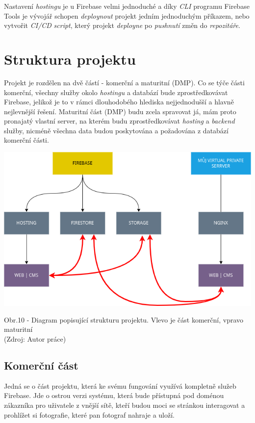\documentclass[12pt,a4paper]{report}
\begin{document}
  Nastavení \emph{hostingu} je u Firebase velmi jednoduché a díky \emph{CLI} programu Firebase Tools je vývojář schopen
  \emph{deploynout} projekt jedním jednoduchým příkazem, nebo vytvořit \emph{CI/CD} \emph{script}, který projekt \emph{deployne} po 
  \emph{pushnutí} změn do \emph{repozitáře}. 

  \chapter{Struktura projektu}
  Projekt je rozdělen na dvě částí - komerční a maturitní (DMP). Co se týče části komerční, všechny
  služby okolo \emph{hostingu} a databází bude zprostředkovávat Firebase, jelikož je to v rámci
  dlouhodobého hlediska nejjednodušší a hlavně nejlevnější řešení. Maturitní část (DMP) budu zcela
  spravovat já, mám proto pronajatý vlastní server, na kterém budu zprostředkovávat \emph{hosting} a
  \emph{backend} služby, nicméně všechna data budou poskytována a požadována z databází komerční
  části.
 
  \vspace*{0.5cm}
  \noindent\includegraphics[width=\linewidth]{project_structure.png}
  \begin{center}
    Obr.10 -  Diagram popisující strukturu projektu. Vlevo je část komerční, vpravo maturitní \\
    (Zdroj: Autor práce)
  \end{center}
  \vspace*{0.5cm}
  
  \section{Komerční část}
  Jedná se o část projektu, která ke svému fungování využívá kompletně služeb Firebase.
  Jde o ostrou verzi systému, která bude přístupná pod doménou zákazníka pro uživatele z vnější sítě, kteří budou moci se stránkou 
  interagovat a prohlížet si fotografie, které pan fotograf nahraje a uloží.
\end{document}
